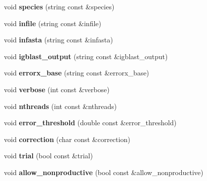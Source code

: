 \begin{DoxyCompactItemize}
void {\bfseries species} (string const \&species)
\item 
\mbox{\label{classerrorx_1_1_error_x_options_a959de3f6891a7d03c89eb754655c508c}} 
void {\bfseries infile} (string const \&infile)
\item 
\mbox{\label{classerrorx_1_1_error_x_options_ab96e7dde52c054b004439a37c24764af}} 
void {\bfseries infasta} (string const \&infasta)
\item 
\mbox{\label{classerrorx_1_1_error_x_options_a58c127f03cf3a83806f12340f0fd24f0}} 
void {\bfseries igblast\+\_\+output} (string const \&igblast\+\_\+output)
\item 
\mbox{\label{classerrorx_1_1_error_x_options_a69599f3d8575107ad540e10e958d4708}} 
void {\bfseries errorx\+\_\+base} (string const \&errorx\+\_\+base)
\item 
\mbox{\label{classerrorx_1_1_error_x_options_aa8af7a4d483d3bec38f53ef538d1e1fb}} 
void {\bfseries verbose} (int const \&verbose)
\item 
\mbox{\label{classerrorx_1_1_error_x_options_a597e5ef73f288b1e295ebc14fcff0eee}} 
void {\bfseries nthreads} (int const \&nthreads)
\item 
\mbox{\label{classerrorx_1_1_error_x_options_ac304467292e603cef087a2a2891b4e91}} 
void {\bfseries error\+\_\+threshold} (double const \&error\+\_\+threshold)
\item 
\mbox{\label{classerrorx_1_1_error_x_options_adf114f318876400bab0d349b88e67de8}} 
void {\bfseries correction} (char const \&correction)
\item 
\mbox{\label{classerrorx_1_1_error_x_options_a1a44834413335f68d91021c2f19f445f}} 
void {\bfseries trial} (bool const \&trial)
\item 
\mbox{\label{classerrorx_1_1_error_x_options_ac3f5b525e27f2b724efaed80c22349e6}} 
void {\bfseries allow\+\_\+nonproductive} (bool const \&allow\+\_\+nonproductive)
\end{DoxyCompactItemize}


